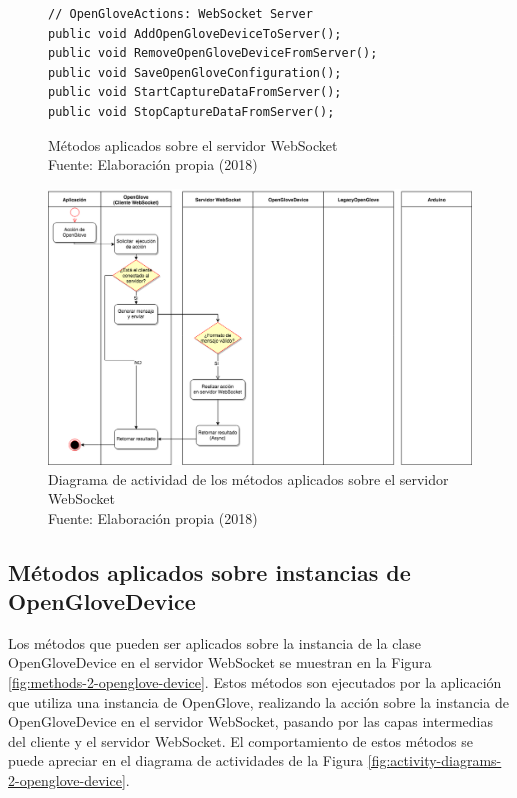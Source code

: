 \begin{figure}[H]
  \begin{center} 
\begin{lstlisting}
// OpenGloveActions: WebSocket Server
public void AddOpenGloveDeviceToServer();
public void RemoveOpenGloveDeviceFromServer();
public void SaveOpenGloveConfiguration();
public void StartCaptureDataFromServer();
public void StopCaptureDataFromServer();
\end{lstlisting}
   \captionsetup{justification=centering}
    \caption[Métodos aplicados sobre el servidor WebSocket]{Métodos aplicados sobre el servidor WebSocket \\Fuente: Elaboración propia (2018)}
    \label{fig:methods-1-websocket-server}
  \end{center}
\end{figure}


\begin{figure}[H]
  \begin{center} 
   	\includegraphics[width=1.0\textwidth]{images/chapter04/ActivityDiagrams-OpenGloveActions-1.png} 
   	\captionsetup{justification=centering}
    \caption[Diagrama de actividad de los métodos aplicados sobre el servidor WebSocket]{Diagrama de actividad de los métodos aplicados sobre el servidor WebSocket\\Fuente: Elaboración propia (2018)}
    \label{fig:activity-diagrams-1-websocket-server}
  \end{center}
\end{figure}





\subsection{Métodos aplicados sobre instancias de OpenGloveDevice}
\label{subsection:method-openglove-device}
Los métodos que pueden ser aplicados sobre la instancia de la clase OpenGloveDevice en el servidor WebSocket se muestran en la Figura \ref{fig:methods-2-openglove-device}. Estos métodos son ejecutados por la aplicación que utiliza una instancia de OpenGlove, realizando la acción sobre la instancia de OpenGloveDevice en el servidor WebSocket, pasando por las capas intermedias del cliente y el servidor WebSocket. El comportamiento de estos métodos se puede apreciar en el diagrama de actividades de la Figura \ref{fig:activity-diagrams-2-openglove-device}.


